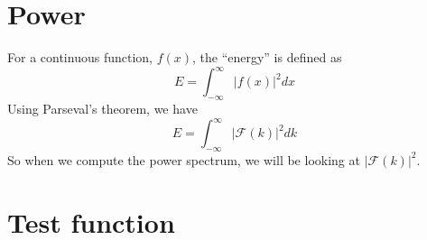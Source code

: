 \documentclass[11pt]{article}
\begin{document}
\section*{Power}

For a continuous function, $f(x)$, the ``energy'' is defined as
\begin{equation}
E = \int_{-\infty}^\infty |f(x)|^2 dx
\end{equation}
Using Parseval's theorem, we have
\begin{equation}
E = \int_{-\infty}^\infty |\mathcal{F}(k)|^2 dk
\end{equation}
%
So when we compute the power spectrum, we will be looking at
$|\mathcal{F}(k)|^2$. \\



\section*{Test function}
\end{document}

